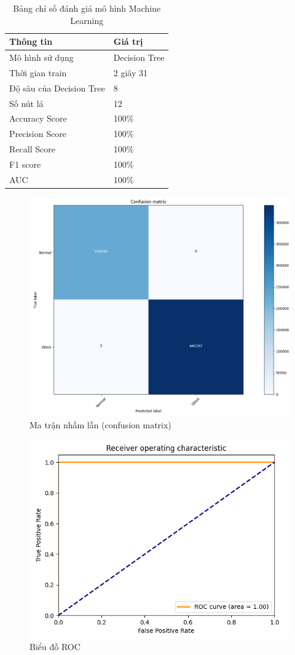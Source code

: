 \documentclass[a4paper]{article}
\begin{document}
\begin{table}[H]
\centering
\caption{Bảng chỉ số đánh giá mô hình Machine Learning}
\label{tab:danhgiamodel}
\addvspace{0.3cm}
\begin{tabular}{|p{5.5cm}|p{5.5cm}|}
\hline
\textbf{Thông tin} & \textbf{Giá trị} \\ \hline
Mô hình sử dụng & Decision Tree \\ \hline
Thời gian train & 2 giây 31 \\ \hline
Độ sâu của Decision Tree & 8\\ \hline
Số nút lá & 12\\ \hline
Accuracy Score & 100\% \\ \hline
Precision Score & 100\% \\ \hline
Recall Score & 100\% \\ \hline
F1 score & 100\% \\ \hline
AUC & 100\% \\ \hline
\end{tabular}
\end{table}

\begin{figure}
    \centering
    \includegraphics[width=0.75\linewidth]{images//result/confusion_matrix.png}
    \caption{Ma trận nhầm lẫn (confusion matrix)}
    \label{fig:confusion_matrix}
\end{figure}

\begin{figure}
    \centering
    \includegraphics[width=0.75\linewidth]{images//result/ROC.png}
    \caption{Biểu đồ ROC}
    \label{fig:ROC}
\end{figure}
\end{document}
